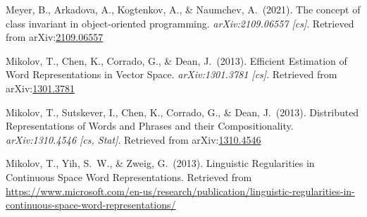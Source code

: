 \documentclass[12pt,twoside]{article}
\begin{document}
{\begin{thebibliography}{1079}
\mdbibitemlabel{}Meyer, B., Arkadova, A., Kogtenkov, A., \& Naumchev, A.~(2021). The concept of class invariant in object-oriented programming. \emph{arXiv:2109.06557 {}[cs]}. Retrieved from arXiv:\href{http://arxiv.org/abs/2109.06557}{2109.06557}%

\mdbibitemlabel{}Mikolov, T., Chen, K., Corrado, G., \& Dean, J.~(2013). Efficient Estimation of Word Representations in Vector Space. \emph{arXiv:1301.3781 {}[cs]}. Retrieved from arXiv:\href{http://arxiv.org/abs/1301.3781}{1301.3781}%

\mdbibitemlabel{}Mikolov, T., Sutskever, I., Chen, K., Corrado, G., \& Dean, J.~(2013). Distributed Representations of Words and Phrases and their Compositionality. \emph{arXiv:1310.4546 {}[cs, Stat]}. Retrieved from arXiv:\href{http://arxiv.org/abs/1310.4546}{1310.4546}%

\mdbibitemlabel{}Mikolov, T., Yih, S.~W., \& Zweig, G.~(2013). Linguistic Regularities in Continuous Space Word Representations. Retrieved from \href{https://www.microsoft.com/en-us/research/publication/linguistic-regularities-in-continuous-space-word-representations/}{{\ttfamily https://\hspace{0pt}www.\hspace{0pt}microsoft.\hspace{0pt}com/\hspace{0pt}en-\hspace{0pt}us/\hspace{0pt}research/\hspace{0pt}publication/\hspace{0pt}linguistic-\hspace{0pt}regularities-\hspace{0pt}in-\hspace{0pt}continuous-\hspace{0pt}space-\hspace{0pt}word-\hspace{0pt}representations/\hspace{0pt}}}%


\end{thebibliography}}
\end{document}
